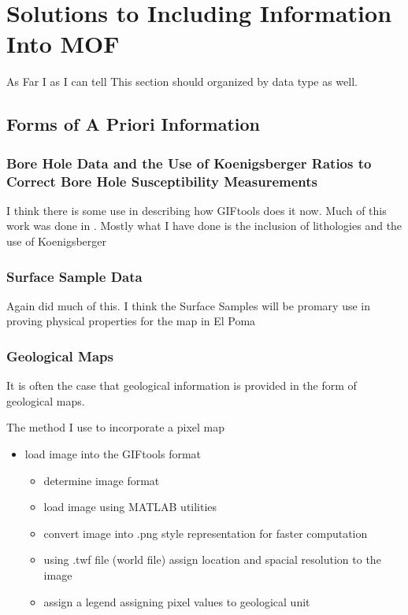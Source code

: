 
\chapter{Solutions to Including Information Into \ac{MOF}}
\label{ch:Introduction}

\begin{epigraph}

\end{epigraph}

As Far I as I can tell This section should organized by data type as well.

\section{Forms of A Priori Information}
\label{sec:Forms of A Priori Information}

\subsection{Bore Hole Data and the Use of Koenigsberger Ratios to Correct Bore Hole Susceptibility Measurements}
\label{sec: Bore Hole Data}


I think there is some use in describing how GIFtools does it now. Much of this work was done in \cite{williams2008geologically}. Mostly what I have done is the inclusion of lithologies and the use of Koenigsberger
	
\subsection{Surface Sample Data}
\label{sec: Surface Sample Data}

Again \cite{williams2008geologically} did much of this. I think the Surface Samples will be promary use in proving physical properties for the map in El Poma


\subsection{Geological Maps}
\label{sec: Geological Maps}

It is often the case that geological information is provided in the form of geological maps. 

The method I use to incorporate a pixel map

\begin{itemize}
\item load image into the GIFtools format
\begin{itemize}
	\item determine image format
	\item load image using MATLAB utilities
	\item convert image into .png style representation for faster computation
	\item using .twf file (world file) assign location and spacial resolution to the image
	\item assign a legend assigning pixel values to geological unit
\end{itemize}
\end{itemize}


